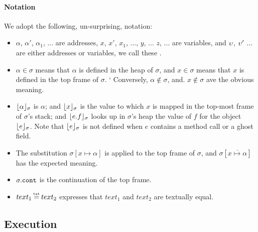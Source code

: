 \paragraph{Notation} We adopt the following, un-surprising, notation:
\begin{itemize}
\item
$\alpha$, $\alpha'$, $\alpha_1$, ... are addresses,   $x$, $x'$, $x_1$, ..., $y$, ... $z$, ... are variables, and $\upsilon$, $\upsilon'$ ... are either addresses or variables, we call these \emph{\atoms}.
\item
$\alpha \in \sigma$ means that $\alpha$ is defined in the heap of $\sigma$, and $x\in \sigma$ means that $x$ is defined in the top frame of $\sigma$.
`%
Conversely, %
 $\alpha\notin\sigma$, and. $x\notin\sigma$ %
 ave the obvious meaning.
\item
$\lfloor \alpha \rfloor_{\sigma}$  is $\alpha$; and $\lfloor x \rfloor_{\sigma}$  is the value to which  $x$  is mapped in the top-most frame of $\sigma$'s stack; 
and $\lfloor e.f \rfloor_{\sigma}$ looks up in $\sigma$'s heap the value of $f$ for the object  $\lfloor e \rfloor_{\sigma}$.
Note that $\lfloor e \rfloor_{\sigma}$ is not defined when $e$ contains a method call or a ghost field.
\item The substitution  $\sigma[x \mapsto \alpha]$ is applied to the top frame of $\sigma$, and $\sigma[\overline{x \mapsto \alpha}]$ %
has the expected meaning.
\item
$\sigma.{\texttt{cont}}$ is the continuation of the top frame.
\item
$text_1 \txteq text_2$ expresses that $text_1$ and $text_2$ are textually equal.
\end{itemize}

  

  
\subsection{\LangOO Execution}
\label{sect:execution}

